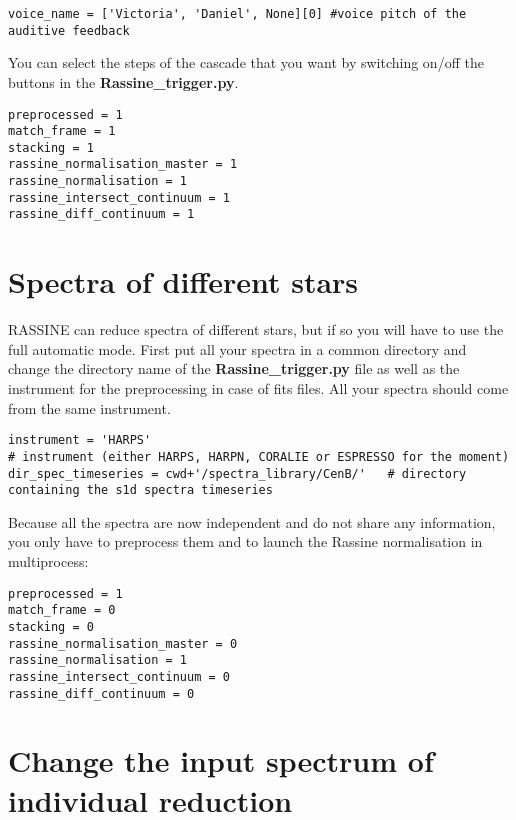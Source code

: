 \documentclass{article}
\begin{document}
\begin{lstlisting}
voice_name = ['Victoria', 'Daniel', None][0] #voice pitch of the auditive feedback
\end{lstlisting}

You can select the steps of the cascade that you want by switching on/off the buttons in the \textbf{Rassine\_trigger.py}. 

\begin{lstlisting}
preprocessed = 1
match_frame = 1
stacking = 1
rassine_normalisation_master = 1
rassine_normalisation = 1
rassine_intersect_continuum = 1
rassine_diff_continuum = 1
\end{lstlisting}

\newpage
\section{Spectra of different stars}

RASSINE can reduce spectra of different stars, but if so you will have to use the full automatic mode. First put all your spectra in a common directory and change the directory name of the \textbf{Rassine\_trigger.py} file as well as the instrument for the preprocessing in case of fits files. All your spectra should come from the same instrument. 

\begin{lstlisting}
instrument = 'HARPS'                                                     # instrument (either HARPS, HARPN, CORALIE or ESPRESSO for the moment)
dir_spec_timeseries = cwd+'/spectra_library/CenB/'   # directory containing the s1d spectra timeseries

\end{lstlisting}

Because all the spectra are now independent and do not share any information, you only have to preprocess them and to launch the Rassine normalisation in multiprocess:

\begin{lstlisting}
preprocessed = 1
match_frame = 0
stacking = 0
rassine_normalisation_master = 0
rassine_normalisation = 1
rassine_intersect_continuum = 0
rassine_diff_continuum = 0
\end{lstlisting}




\newpage
\section{Change the input spectrum of individual reduction}
\end{document}
